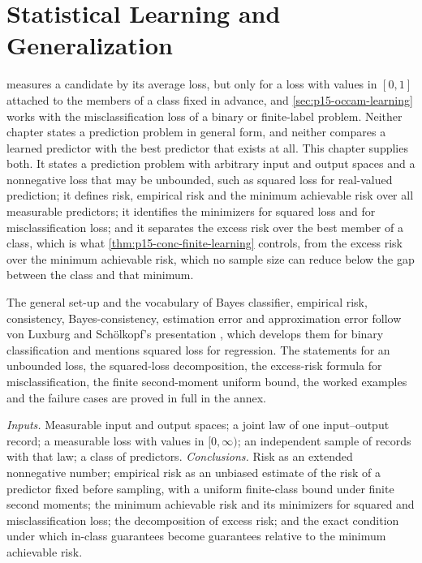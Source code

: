 \chapter{Statistical Learning and Generalization}
\label{sec:p15-w02b-p15-064-prediction-risk}

 measures a candidate by its
average loss, but only for a loss with values in \([0,1]\) attached to the
members of a class fixed in advance, and \cref{sec:p15-occam-learning}
works with the misclassification loss of a binary or finite-label problem.
Neither chapter states a prediction problem in general form, and neither
compares a learned predictor with the best predictor that exists at all.
This chapter supplies both. It states a prediction problem with arbitrary
input and output spaces and a nonnegative loss that may be unbounded, such
as squared loss for real-valued prediction; it defines risk, empirical risk
and the minimum achievable risk over all measurable predictors; it
identifies the minimizers for squared loss and for misclassification loss;
and it separates the excess risk over the best member of a class, which is
what \cref{thm:p15-conc-finite-learning} controls, from the excess risk over
the minimum achievable risk, which no sample size can reduce below the gap
between the class and that minimum.

The general set-up and the vocabulary of Bayes classifier, empirical risk,
consistency, Bayes-consistency, estimation error and approximation error
follow von Luxburg and Sch\"olkopf's presentation
\cite[Sections~2.2--2.4, pp.~2--9]{LuxburgScholkopf2008Author}, which
develops them for binary classification and mentions squared loss for
regression. The statements for an unbounded loss, the squared-loss
decomposition, the excess-risk formula for misclassification, the finite
second-moment uniform bound, the worked examples and the failure cases are
proved in full in the annex.

\emph{Inputs.} Measurable input and output spaces; a joint law of one
input--output record; a measurable loss with values in \([0,\infty)\);
an independent sample of records with that law; a class of predictors.
\emph{Conclusions.} Risk as an extended nonnegative number; empirical risk
as an unbiased estimate of the risk of a predictor fixed before sampling,
with a uniform finite-class bound under finite second moments; the minimum
achievable risk and its minimizers for squared and misclassification loss;
the decomposition of excess risk; and the exact condition under which
in-class guarantees become guarantees relative to the minimum achievable
risk.


